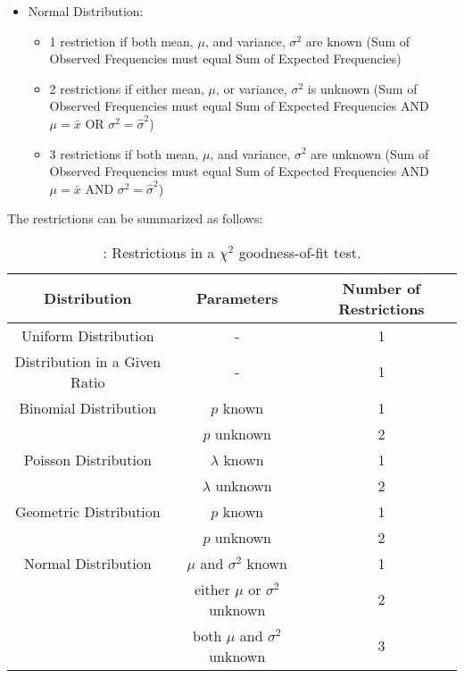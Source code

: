 \begin{note}
\begin{itemize}
\begin{itemize}
	\end{itemize} 
	\item Normal Distribution:
	\begin{itemize}
		\item 1 restriction if both mean, $\mu$, and variance, $\sigma^2$ are known (Sum of Observed Frequencies must equal Sum of Expected Frequencies)
		\item 2 restrictions if either mean, $\mu$, or variance, $\sigma^2$ is unknown (Sum of Observed Frequencies must equal Sum of Expected Frequencies AND $\mu=\bar{x}$ OR $\sigma^2=\hat{\sigma}^2$)
		\item 3 restrictions if both mean, $\mu$, and variance, $\sigma^2$ are unknown (Sum of Observed Frequencies must equal Sum of Expected Frequencies AND $\mu=\bar{x}$ AND $\sigma^2=\hat{\sigma}^2$)
	\end{itemize} 
\end{itemize} 

The restrictions can be summarized as follows:
\begin{table}[H]
	\centering
	\begin{tabular}{|c|c|c|}
		\hline
		\textbf{Distribution} & \textbf{Parameters} & \textbf{Number of Restrictions} \\
		\hline
		Uniform Distribution & - & 1 \\
		\hline
		Distribution in a Given Ratio & - & 1 \\
		\hline
		Binomial Distribution & $p$ known & 1 \\
		 & $p$ unknown & 2 \\
		 \hline 
		 Poisson Distribution & $\lambda$ known & 1 \\
		 & $\lambda$ unknown & 2 \\
		 \hline
		 Geometric Distribution & $p$ known & 1 \\
		 & $p$ unknown & 2 \\
		 \hline 
		 Normal Distribution & $\mu$ and $\sigma^2$ known & 1 \\
		 & either $\mu$ or $\sigma^2$ unknown & 2 \\
		 & both $\mu$ and $\sigma^2$ unknown & 3 \\
		 \hline
	\end{tabular}
\caption{\label{mod2:ChiSquaredRestTable}: Restrictions in a $\chi^2$ goodness-of-fit test.}
\end{table} 
	
\end{note}






